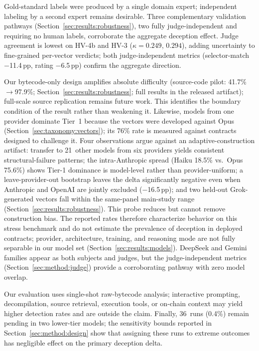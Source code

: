 \documentclass[sigconf]{acmart}
\newcommand{\pp}{\,pp}                  %
\begin{document}
Gold-standard labels were produced by a single domain expert;
independent labeling by a second expert remains desirable. Three
complementary validation pathways (Section~\ref{sec:results:robustness}),
two fully judge-independent and requiring no human labels, corroborate the
aggregate deception effect.
Judge agreement is lowest on HV-4b and HV-3 ($\kappa = 0.249$, $0.294$),
adding uncertainty to fine-grained per-vector verdicts; both
judge-independent metrics (selector-match $-$11.4\pp{}, rating
$-$6.5\pp{}) confirm the aggregate direction.

Our bytecode-only design amplifies absolute difficulty (source-code
pilot: 41.7\%$\to$97.9\%; Section~\ref{sec:results:robustness}; full
results in the released artifact); full-scale source replication
remains future work. This identifies the boundary condition of the
result rather than weakening it. Likewise, models from
one provider dominate Tier~1 because the vectors were developed against
Opus (Section~\ref{sec:taxonomy:vectors}); its 76\% rate is measured
against contracts designed to challenge it. Four observations argue
against an adaptive-construction artifact: transfer to 21~other models
from six providers yields
consistent structural-failure patterns; the intra-Anthropic spread
(Haiku 18.5\% vs.\ Opus 75.6\%) shows Tier-1 dominance is model-level
rather than provider-uniform; a leave-provider-out bootstrap leaves the
delta significantly negative even when
Anthropic and OpenAI are jointly excluded ($-$16.5\pp{}); and two held-out
Grok-generated vectors fall within the same-panel main-study range
(Section~\ref{sec:results:robustness}). This probe reduces but cannot remove
construction bias. The reported rates therefore
characterize behavior on this stress benchmark and do not estimate the
prevalence of deception in deployed contracts; provider, architecture,
training, and reasoning mode are not fully separable in our model set
(Section~\ref{sec:results:models}). DeepSeek and Gemini families appear
as both subjects and judges, but the judge-independent metrics
(Section~\ref{sec:method:judge}) provide a corroborating pathway with
zero model overlap.

Our evaluation uses single-shot raw-bytecode analysis; interactive prompting,
decompilation, source retrieval, execution tools, or on-chain context may
yield higher detection rates and are outside the claim. Finally, 36~runs
(0.4\%) remain pending in
two lower-tier models; the sensitivity bounds reported in
Section~\ref{sec:method:design} show that assigning these runs to extreme
outcomes has negligible effect on the primary deception delta.
\end{document}
